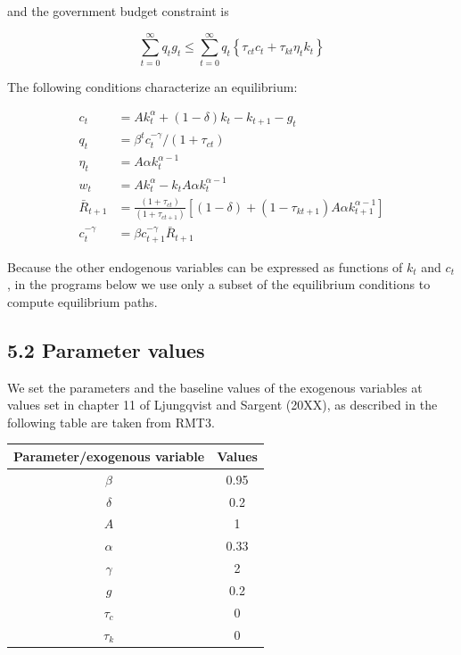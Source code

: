 \documentclass[10pt]{article}
\begin{document}
and the government budget constraint is

$$
\sum_{t=0}^{\infty} q_{t} g_{t} \leq \sum_{t=0}^{\infty} q_{t}\left\{\tau_{c t} c_{t}+\tau_{k t} \eta_{t} k_{t}\right\}
$$

The following conditions characterize an equilibrium:


\begin{align*}
c_{t} & =A k_{t}^{\alpha}+(1-\delta) k_{t}-k_{t+1}-g_{t}  \tag{14}\\
q_{t} & =\beta^{t} c_{t}^{-\gamma} /\left(1+\tau_{c t}\right)  \tag{15}\\
\eta_{t} & =A \alpha k_{t}^{\alpha-1}  \tag{16}\\
w_{t} & =A k_{t}^{\alpha}-k_{t} A \alpha k_{t}^{\alpha-1}  \tag{17}\\
\bar{R}_{t+1} & =\frac{\left(1+\tau_{c t}\right)}{\left(1+\tau_{c t+1}\right)}\left[(1-\delta)+\left(1-\tau_{k t+1}\right) A \alpha k_{t+1}^{\alpha-1}\right]  \tag{18}\\
c_{t}^{-\gamma} & =\beta c_{t+1}^{-\gamma} \bar{R}_{t+1} \tag{19}
\end{align*}


Because the other endogenous variables can be expressed as functions of $k_{t}$ and $c_{t}$, in the programs below we use only a subset of the equilibrium conditions to compute equilibrium paths.

\subsection*{5.2 Parameter values}
We set the parameters and the baseline values of the exogenous variables at values set in chapter 11 of Ljungqvist and Sargent (20XX), as described in the following table are taken from RMT3.

\begin{center}
\begin{tabular}{cc}
\hline
Parameter/exogenous variable & Values \\
\hline
$\beta$ & 0.95 \\
$\delta$ & 0.2 \\
$A$ & 1 \\
$\alpha$ & 0.33 \\
$\gamma$ & 2 \\
$g$ & 0.2 \\
$\tau_{c}$ & 0 \\
$\tau_{k}$ & 0 \\
\hline
\end{tabular}
\end{center}
\end{document}
